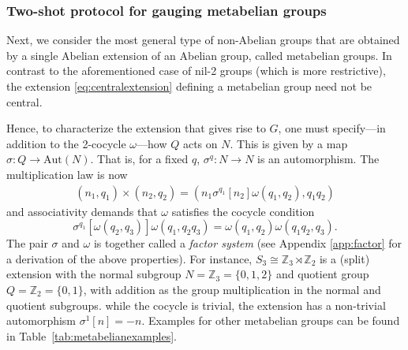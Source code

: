 \documentclass[nofootinbib,prx,twocolumn,showpacs,superscriptaddress,notitlepage,amsmath,amssymb]{revtex4-2}
\theoremstyle{definition}
\def\aut#1#2{\sigma^{#1} \left [ {#2} \right]}
\begin{document}
\subsubsection{Two-shot protocol for gauging metabelian groups}

Next, we consider the most general type of non-Abelian groups that are obtained by a single Abelian extension of an Abelian group, called metabelian groups. In contrast to the aforementioned case of nil-2 groups (which is more restrictive), the extension \eqref{eq:centralextension} defining a metabelian group need not be central.

Hence, to characterize the extension that gives rise to $G$, one must specify---in addition to the 2-cocycle $\omega$---how $Q$ acts on $N$. This is given by a map $\sigma: Q \rightarrow \text{Aut}(N)$. That is, for a fixed $q$, $\sigma^q: N \rightarrow N$ is an automorphism.
The multiplication law is now
\begin{align}
    (n_1,q_1) \times (n_2,q_2) = (n_1\aut{q_1}{n_2}\omega(q_1,q_2),q_1q_2)
    \label{eq:multiplicationlaw}
\end{align}
and associativity demands that $\omega$ satisfies the cocycle condition
\begin{equation}
    \aut{q_1}{\omega(q_2,q_3)} \omega(q_1,q_2q_3)  = \omega(q_1,q_2) \omega(q_1q_2,q_3).
    \label{equ:cocyclecondition}
\end{equation}
The pair $\sigma$ and $\omega$ is together called a \textit{factor system} (see Appendix \ref{app:factor} for a derivation of the above properties). For instance, $S_3 \cong \mathbb Z_3 \rtimes \mathbb Z_2$ is a (split) extension with the normal subgroup $N=\mathbb Z_3 = \{0,1,2\}$ and quotient group $Q=\mathbb Z_2 = \{ 0,1\}$, with addition as the group multiplication in the normal and quotient subgroups. while the cocycle is trivial, the extension has a non-trivial automorphism $\sigma^1[n] = -n$. Examples for other metabelian groups can be found in Table~\ref{tab:metabelianexamples}.
\end{document}
